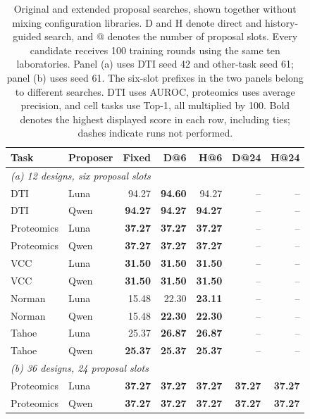 \begin{table}[htbp]
\caption{Original and extended proposal searches, shown together without mixing configuration libraries. D and H denote direct and history-guided search, and @ denotes the number of proposal slots. Every candidate receives 100 training rounds using the same ten laboratories. Panel (a) uses DTI seed 42 and other-task seed 61; panel (b) uses seed 61. The six-slot prefixes in the two panels belong to different searches. DTI uses AUROC, proteomics uses average precision, and cell tasks use Top-1, all multiplied by 100. Bold denotes the highest displayed score in each row, including ties; dashes indicate runs not performed.}
\label{tab:proposal-heldout-combined}
\label{tab:completed-short6}
\label{tab:completed-long24}
\centering\small
\setlength{\tabcolsep}{3pt}
\begin{tabularx}{\linewidth}{@{}Xlrrrrr@{}}
\toprule
Task & Proposer & Fixed & D@6 & H@6 & D@24 & H@24 \\
\midrule
\multicolumn{7}{l}{\textit{(a) 12 designs, six proposal slots}} \\
DTI & Luna & 94.27 & \textbf{94.60} & 94.27 & -- & -- \\
DTI & Qwen & \textbf{94.27} & \textbf{94.27} & \textbf{94.27} & -- & -- \\
Proteomics & Luna & \textbf{37.27} & \textbf{37.27} & \textbf{37.27} & -- & -- \\
Proteomics & Qwen & \textbf{37.27} & \textbf{37.27} & \textbf{37.27} & -- & -- \\
VCC & Luna & \textbf{31.50} & \textbf{31.50} & \textbf{31.50} & -- & -- \\
VCC & Qwen & \textbf{31.50} & \textbf{31.50} & \textbf{31.50} & -- & -- \\
Norman & Luna & 15.48 & 22.30 & \textbf{23.11} & -- & -- \\
Norman & Qwen & 15.48 & \textbf{22.30} & \textbf{22.30} & -- & -- \\
Tahoe & Luna & 25.37 & \textbf{26.87} & \textbf{26.87} & -- & -- \\
Tahoe & Qwen & \textbf{25.37} & \textbf{25.37} & \textbf{25.37} & -- & -- \\
\midrule
\multicolumn{7}{l}{\textit{(b) 36 designs, 24 proposal slots}} \\
Proteomics & Luna & \textbf{37.27} & \textbf{37.27} & \textbf{37.27} & \textbf{37.27} & \textbf{37.27} \\
Proteomics & Qwen & \textbf{37.27} & \textbf{37.27} & \textbf{37.27} & \textbf{37.27} & \textbf{37.27} \\

\end{tabularx}
\end{table}
